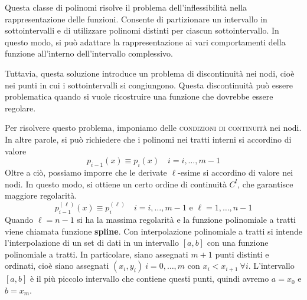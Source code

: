 \documentclass{article}
\begin{document}
\begin{center}
\end{center}
Questa classe di polinomi risolve il problema dell'inflessibilità nella
rappresentazione delle funzioni. Consente di partizionare un
intervallo in sottointervalli e di utilizzare polinomi distinti per ciascun
sottointervallo. In questo modo, si può  adattare la rappresentazione ai vari comportamenti
della funzione all'interno dell'intervallo complessivo.

Tuttavia, questa soluzione introduce un problema di discontinuità nei nodi,
cioè nei punti in cui i sottointervalli si congiungono. Questa discontinuità
può essere problematica quando si vuole ricostruire una funzione che dovrebbe
essere regolare. 

Per risolvere questo problema, imponiamo delle \textsc{condizioni di
continuità} nei nodi. In altre parole, si può richiedere che i polinomi nei
tratti interni si accordino di valore
$$p_{i-1}(x)\equiv p_i(x)\quad i=i,\ldots,m-1$$
Oltre a ciò, possiamo imporre che le derivate $\ell$-esime si accordino di
valore nei nodi. In questo modo, si ottiene un certo ordine di continuità
$C^{l}$, che garantisce maggiore regolarità.
$$p^{(\ell)}_{i-1}(x)\equiv p_{i}^{(\ell)}\quad i=i,\ldots,m-1\text{ e }\ell=1,\ldots,n-1$$
Quando $\ell=n-1$ si ha la massima regolarità e la funzione polinomiale a
tratti viene chiamata funzione \textbf{spline}.
\vskip 0.1in
Con interpolazione polinomiale a tratti si intende l'interpolazione di un set
di dati in un intervallo $[a,b]$ con una funzione polinomiale a tratti. In
particolare, siano assegnati $m+1$ punti distinti e ordinati, cioè siano
assegnati $(x_i,y_i)\ i=0,\ldots,m$ con $x_i<x_{i+1}\ \forall i$. L'intervallo
$[a,b]$ è il più piccolo intervallo che contiene questi punti, quindi avremo $a=x_0$ e
$b=x_{m}$. 
\end{document}
